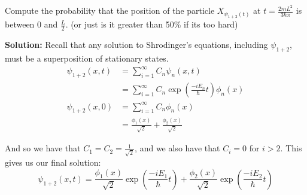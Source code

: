 \documentclass{article}
\begin{document}
Compute the probability that the position of the particle $X_{\psi_{1+2}(t)}$ at $t=\frac{2mL^2}{3\hbar\pi}$ is between $0$ and $\frac{L}{2}$. (or just is it greater than 50\% if its too hard)

\noindent\textbf{Solution:} Recall that any solution to Shrodinger's equations, including $\psi_{1+2}$, must be a superposition of stationary states.
\begin{align*}
    \psi_{1+2}(x,t)&=\sum_{i=1}^\infty C_n\psi_n(x,t)\tag{superposition of stationary states}\\
    &=\sum_{i=1}^\infty C_n\exp\left(\frac{-iE_n}{\hbar}t\right)\phi_n(x)\tag{problem 1 \& 2}\\
    \psi_{1+2}(x,0)&=\sum_{i=1}^\infty C_n\phi_n(x)\\
    &=\frac{\phi_1(x)}{\sqrt{2}}+\frac{\phi_2(x)}{\sqrt{2}}\tag{initial condition}
\end{align*}

And so we have that $C_1=C_2=\frac{1}{\sqrt{2}}$, and we also have that $C_i=0$ for $i>2$. This gives us our final solution:
$$\psi_{1+2}(x,t)=\frac{\phi_1(x)}{\sqrt{2}}\exp\left(\frac{-iE_1}{\hbar}t\right)+\frac{\phi_2(x)}{\sqrt{2}}\exp\left(\frac{-iE_2}{\hbar}t\right)$$
\smallskip
\end{document}
